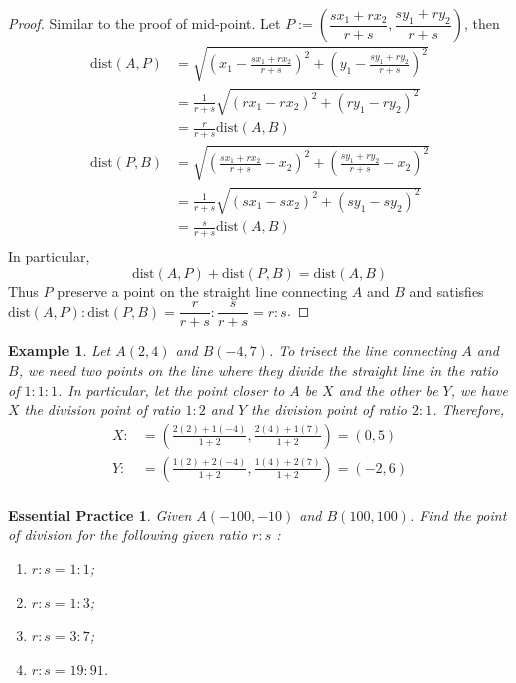\documentclass[12pt]{article}
\newtheorem*{example}{Example}
\newtheorem{exercise}{Essential Practice}[subsubsection]
\begin{document}
    \begin{proof}
        Similar to the proof of mid-point. Let $P:=(\dfrac{sx_1+rx_2}{r+s},\dfrac{sy_1+ry_2}{r+s})$, then\begin{align*}
            \mathrm{dist}(A,P)&=\sqrt{(x_1-\frac{sx_1+rx_2}{r+s})^2+(y_1-\frac{sy_1+ry_2}{r+s})^2}\\
            &=\frac{1}{r+s}\sqrt{(rx_1-rx_2)^2+(ry_1-ry_2)^2}\\
            &=\frac{r}{r+s}\mathrm{dist}(A,B)\\
            \mathrm{dist}(P,B)&=\sqrt{(\frac{sx_1+rx_2}{r+s}-x_2)^2+(\frac{sy_1+ry_2}{r+s}-x_2)^2}\\
            &=\frac{1}{r+s}\sqrt{(sx_1-sx_2)^2+(sy_1-sy_2)^2}\\
            &=\frac{s}{r+s}\mathrm{dist}(A,B)\\
        \end{align*}
        In particular, $$\mathrm{dist}(A,P)+\mathrm{dist}(P,B)=\mathrm{dist}(A,B)$$
        Thus $P$ preserve a point on the straight line connecting $A$ and $B$ and satisfies $\mathrm{dist}(A,P):\mathrm{dist}(P,B)=\dfrac{r}{r+s}:\dfrac{s}{r+s}=r:s$.
    \end{proof}

    \begin{example}
        Let $A(2,4)$ and $B(-4,7)$. To trisect the line connecting $A$ and $B$, we need two points on the line where they divide the straight line in the ratio of $1:1:1$. In particular, let the point closer to $A$ be $X$ and the other be $Y$, we have $X$ the division point of ratio $1:2$ and $Y$ the division point of ratio $2:1$. Therefore,\begin{align*}
            X:&=(\frac{2(2)+1(-4)}{1+2}, \frac{2(4)+1(7)}{1+2})=(0,5)\\
            Y:&=(\frac{1(2)+2(-4)}{1+2}, \frac{1(4)+2(7)}{1+2})=(-2,6)\\
        \end{align*}
    \end{example}

    \begin{exercise}
        Given $A(-100,-10)$ and $B(100,100)$. Find the point of division for the following given ratio $r:s$ :\begin{enumerate}
            \item $r:s=1:1$;
            \item $r:s=1:3$;
            \item $r:s=3:7$;
            \item $r:s=19:91$.
        \end{enumerate}
    \end{exercise}
\end{document}
